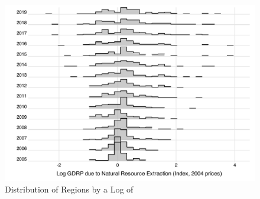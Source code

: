\documentclass[12pt]{article}
\numberwithin{equation}{section}
\numberwithin{table}{section}
\numberwithin{figure}{section}
\begin{document}
\begin{figure}[!htbp]\centering
    \caption{Distribution of Regions by a Log of }
    \includegraphics[width=\textwidth]{Figures/ridgeplot_resourse_extraction_gdp.pdf}
\end{figure}
\end{document}

